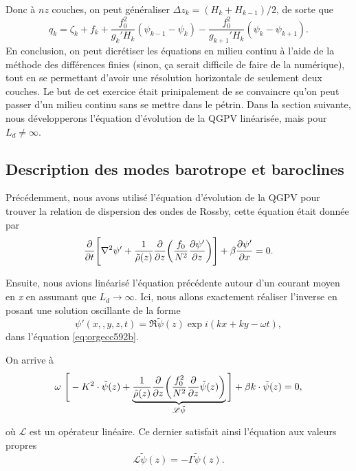 \documentclass[10pt]{report}
\numberwithin{equation}{section}
\newcommand{\tpsi}{\tilde{\psi}}
\begin{document}
Donc à \(nz\) couches, on peut généraliser \(\Delta z_k = (H_k + H_{k-1})/2\), de sorte que
\begin{equation}
\label{eq:org7bf87b9}
q_k = \zeta_k + f_k + \frac{f_0^2}{g_k' H_k}(\psi_{k-1} - \psi_k) - \frac{f_0^2}{g_{k+1}' H_k}(\psi_k - \psi_{k+1}).
\end{equation}
En conclusion, on peut dicrétiser les équations en milieu continu à l'aide de la méthode des différences finies (sinon, ça serait difficile de faire de la numérique), tout en se permettant d'avoir une résolution horizontale de seulement deux couches.
Le but de cet exercice était prinipalement de se convaincre qu'on peut passer d'un milieu continu sans se mettre dans le pétrin.
Dans la section suivante, nous développerons l'équation d'évolution de la QGPV linéarisée, mais pour \(L_d \not = \infty\).

\subsection{Description des modes barotrope et baroclines}
\label{sec:orgd85e79d}
Précédemment, nous avons utilisé l'équation d'évolution de la QGPV pour trouver la relation de dispersion des ondes de Rossby, cette équation était donnée par
\begin{equation}
\label{eq:orgecc592b}
\pdv{t} \Bigg[ \laplacian \psi' + \frac{1}{\tilde{\rho}(z)}\pdv{z}\qty(\frac{f_0}{N^2}\pdv{\psi'}{z}) \Bigg] + \beta \pdv{\psi'}{x} = 0.
\end{equation}

Ensuite, nous avions linéarisé l'équation précédente autour d'un courant moyen en \emph{x} en assumant que \(L_d \rightarrow \infty\).
Ici, nous allons exactement réaliser l'inverse en posant une solution oscillante de la forme
\begin{equation}
\psi'(x,,y,z,t) = \Re \tpsi(z) \exp{ i(kx + ky - \omega t)},
\end{equation}
dans l'équation \ref{eq:orgecc592b}.\bigskip

On arrive à
\begin{equation}
\label{eq:org951a1c5}
\omega\ \Bigg[ - K^2 \cdot \tpsi(z) + \underbrace{\frac{1}{\tilde{\rho}(z)}\pdv{z}\qty(\frac{f_0^2}{N^2} \pdv{z}\tpsi(z))}_{\mathscr{L}\tpsi} \Bigg] + \beta k\cdot \tpsi(z) = 0,
\end{equation}

où \(\mathscr{L}\) est un opérateur linéaire.
Ce dernier satisfait ainsi l'équation aux valeurs propres
\begin{equation}
\mathscr{L}\tpsi(z) = - \Gamma \tpsi(z).
\end{equation}
\end{document}
